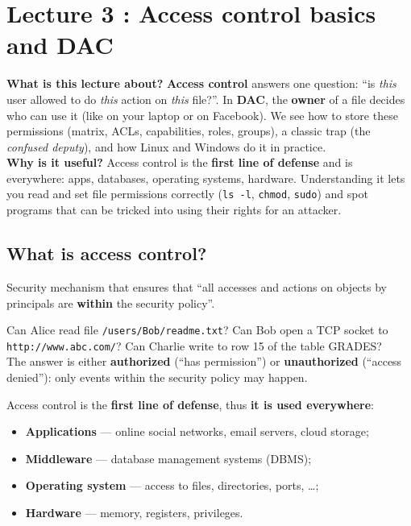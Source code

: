 \chapter{Lecture 3 : Access control basics and DAC}

\begin{rembox}[title=In a nutshell]
\textbf{What is this lecture about?} \textbf{Access control} answers one question:
``is \emph{this} user allowed to do \emph{this} action on \emph{this} file?''. In
\textbf{DAC}, the \textbf{owner} of a file decides who can use it (like on your laptop or
on Facebook). We see how to store these permissions (matrix, ACLs, capabilities, roles,
groups), a classic trap (the \emph{confused deputy}), and how Linux and Windows do it in
practice. \\
\textbf{Why is it useful?} Access control is the \textbf{first line of defense} and is
everywhere: apps, databases, operating systems, hardware. Understanding it lets you read
and set file permissions correctly (\texttt{ls -l}, \texttt{chmod}, \texttt{sudo}) and
spot programs that can be tricked into using their rights for an attacker.
\end{rembox}

\section{What is access control?}

\begin{defnbox}[title=Access control]
Security mechanism that ensures that ``all accesses and actions on objects by principals
are \textbf{within} the security policy''.
\end{defnbox}

\begin{exbox}[title=Questions an access control system answers]
Can Alice read file \texttt{/users/Bob/readme.txt}? Can Bob open a TCP socket to
\texttt{http://www.abc.com/}? Can Charlie write to row 15 of the table GRADES? \\
The answer is either \textbf{authorized} (``has permission'') or
\textbf{unauthorized} (``access denied''): only events within the security policy may
happen.
\end{exbox}

\begin{rembox}[title=Why is access control so important?]
Access control is the \textbf{first line of defense}, thus \textbf{it is used
everywhere}:
\begin{itemize}
  \item \textbf{Applications} --- online social networks, email servers, cloud storage;
  \item \textbf{Middleware} --- database management systems (DBMS);
  \item \textbf{Operating system} --- access to files, directories, ports, \ldots;
  \item \textbf{Hardware} --- memory, registers, privileges.
\end{itemize}
\end{rembox}

